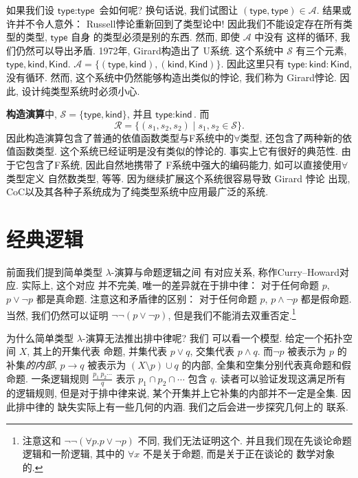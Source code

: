\documentclass[UTF8]{ctexbook}
\newcommand{\cons}[1]{\textsf{#1}}
\theoremstyle{plain}
\theoremstyle{definition}
\theoremstyle{remark}
\begin{document}
如果我们设 \(\cons{type} : \cons{type}\) 会如何呢?
换句话说, 我们试图让 \((\cons{type}, \cons{type}) \in \mathcal A\).
结果或许并不令人意外： Russell悖论重新回到了类型论中!
因此我们不能设定存在所有类型的类型, \(\cons{type}\) 自身
的类型必须是别的东西. 然而, 即使 \(\mathcal A\) 中没有
这样的循环, 我们仍然可以导出矛盾. 1972年, Girard构造出了
U系统.
这个系统中 \(\mathcal S\) 有三个元素,
\(\cons{type}, \cons{kind}, \cons{Kind}\).
\(\mathcal A = \{(\cons{type}, \cons{kind}), (\cons{kind}, \cons{Kind})\}\).
因此这里只有 \(\cons{type} : \cons{kind} : \cons{Kind}\),
没有循环. 然而, 这个系统中仍然能够构造出类似的悖论, 我们称为
Girard悖论. 因此, 设计纯类型系统时必须小心.

\textbf{构造演算}中, \(\mathcal S = \{\cons{type}, \cons{kind}\}\),
并且 \(\cons{type} : \cons{kind}\). 而
\[\mathcal R = \{(s_1,s_2,s_2) \mid s_1, s_2 \in \mathcal S\}.\]
因此构造演算包含了普通的依值函数类型与F系统中的\(\forall\)类型,
还包含了两种新的依值函数类型. 这个系统已经证明是没有类似的悖论的.
事实上它有很好的典范性. 由于它包含了F系统, 因此自然地携带了
F系统中强大的编码能力, 如可以直接使用\(\forall\)类型定义
自然数类型, 等等. 因为继续扩展这个系统很容易导致 Girard 悖论
出现, CoC以及其各种子系统成为了纯类型系统中应用最广泛的系统.

\section{经典逻辑}

前面我们提到简单类型 \(\lambda\)-演算与命题逻辑之间
有对应关系, 称作Curry--Howard对应. 实际上, 这个对应
并不完美, 唯一的差异就在于排中律： 对于任何命题 \(p\),
\(p \vee \neg p\) 都是真命题. 注意这和矛盾律的区别：
对于任何命题 \(p\), \(p \wedge \neg p\) 都是假命题.
当然, 我们仍然可以证明 \(\neg \neg (p \vee \neg p)\),
但是我们不能消去双重否定.\footnote{注意这和
\(\neg\neg (\forall p. p \vee \neg p)\) 不同,
我们无法证明这个. 并且我们现在先谈论命题逻辑和一阶逻辑,
其中的 \(\forall x\) 不是关于命题, 而是关于正在谈论的
数学对象的.}

为什么简单类型 \(\lambda\)-演算无法推出排中律呢? 我们
可以看一个模型. 给定一个拓扑空间 \(X\), 其上的开集代表
命题, 并集代表 \(p \vee q\), 交集代表 \(p \wedge q\).
而\(\neg p\) 被表示为 \(p\) 的补集\emph{的内部},
\(p \to q\) 被表示为 \((X \setminus p) \cup q\) 的内部,
全集和空集分别代表真命题和假命题. 一条逻辑规则
\(\frac{p_1~p_2 \cdots}{q}\) 表示 \(p_1 \cap p_2 \cap\cdots\) 包含 \(q\).
读者可以验证发现这满足所有的逻辑规则, 但是对于排中律来说,
某个开集并上它补集的内部并不一定是全集. 因此排中律的
缺失实际上有一些几何的内涵. 我们之后会进一步探究几何上的
联系.
\end{document}

